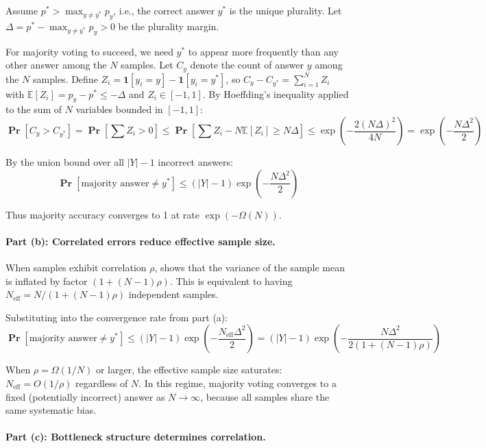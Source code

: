 \documentclass{article}
\theoremstyle{definition}
\theoremstyle{remark}
\renewcommand{\Pr}{\operatorname{\mathbf{Pr}}}
\begin{document}
Assume $p^* > \max_{y \neq y^*} p_y$, i.e., the correct answer $y^*$ is the unique plurality. Let $\Delta = p^* - \max_{y \neq y^*} p_y > 0$ be the plurality margin.

For majority voting to succeed, we need $y^*$ to appear more frequently than any other answer among the $N$ samples. Let $C_y$ denote the count of answer $y$ among the $N$ samples. Define $Z_i = \mathbf{1}[y_i = y] - \mathbf{1}[y_i = y^*]$, so $C_y - C_{y^*} = \sum_{i=1}^N Z_i$ with $\mathbb{E}[Z_i] = p_y - p^* \leq -\Delta$ and $Z_i \in [-1, 1]$. By Hoeffding's inequality applied to the sum of $N$ variables bounded in $[-1,1]$:
\[
\Pr[C_y > C_{y^*}] = \Pr\!\left[\sum Z_i > 0\right] \leq \Pr\!\left[\sum Z_i - N\mathbb{E}[Z_i] \geq N\Delta\right] \leq \exp\!\left( -\frac{2(N\Delta)^2}{4N} \right) = \exp\!\left( -\frac{N\Delta^2}{2} \right)
\]

By the union bound over all $|Y| - 1$ incorrect answers:
\[
\Pr[\text{majority answer} \neq y^*] \leq (|Y| - 1) \exp\left( -\frac{N\Delta^2}{2} \right)
\]

Thus majority accuracy converges to 1 at rate $\exp(-\Omega(N))$.

\paragraph{Part (b): Correlated errors reduce effective sample size.}

When samples exhibit correlation $\rho$,  shows that the variance of the sample mean is inflated by factor $(1 + (N-1)\rho)$. This is equivalent to having $N_{\text{eff}} = N / (1 + (N-1)\rho)$ independent samples.

Substituting into the convergence rate from part (a):
\[
\Pr[\text{majority answer} \neq y^*] \leq (|Y| - 1) \exp\left( -\frac{N_{\text{eff}}\Delta^2}{2} \right) = (|Y| - 1) \exp\left( -\frac{N\Delta^2}{2(1 + (N-1)\rho)} \right)
\]

When $\rho = \Omega(1/N)$ or larger, the effective sample size saturates: $N_{\text{eff}} = O(1/\rho)$ regardless of $N$. In this regime, majority voting converges to a fixed (potentially incorrect) answer as $N \to \infty$, because all samples share the same systematic bias.

\paragraph{Part (c): Bottleneck structure determines correlation.}
\end{document}
